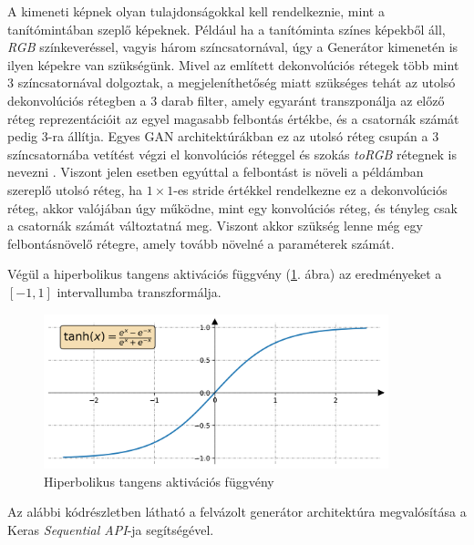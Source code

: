 A kimeneti képnek olyan tulajdonságokkal kell rendelkeznie, mint a tanítómintában szeplő képeknek. Például ha a tanítóminta színes képekből áll, \textit{RGB} színkeveréssel, vagyis három színcsatornával, úgy a Generátor kimenetén is ilyen képekre van szükségünk. Mivel az említett dekonvolúciós rétegek több mint 3 színcsatornával dolgoztak, a megjeleníthetőség miatt szükséges tehát az utolsó dekonvolúciós rétegben a 3 darab filter, amely egyaránt transzponálja az előző réteg reprezentációit az egyel magasabb felbontás értékbe, és a csatornák számát pedig 3-ra állítja.
Egyes GAN architektúrákban ez az utolsó réteg csupán a 3 színcsatornába vetítést végzi el konvolúciós réteggel és szokás \textit{toRGB} rétegnek is nevezni \cite{karras2017progressive, karras2019style, karnewar2020msg}. Viszont jelen esetben egyúttal a felbontást is növeli a példámban szereplő utolsó réteg, ha $1 \times 1$-es stride értékkel rendelkezne ez a dekonvolúciós réteg, akkor valójában úgy működne, mint egy konvolúciós réteg, és tényleg csak a csatornák számát változtatná meg. Viszont akkor szükség lenne még egy felbontásnövelő rétegre, amely tovább növelné a paraméterek számát.

Végül a hiperbolikus tangens aktivációs függvény (\ref{fig:tanh}. ábra) az eredményeket a $[-1, 1]$ intervallumba transzformálja.

\begin{figure}[h]
	\centering
	\includegraphics[width=10cm]{images/tanh.png}
	\caption{Hiperbolikus tangens aktivációs függvény}
	\label{fig:tanh}
\end{figure}

Az alábbi kódrészletben látható a felvázolt generátor architektúra megvalósítása a Keras \textit{Sequential API}-ja segítségével.

